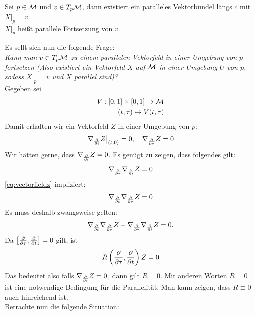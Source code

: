 \begin{defs}
Sei $p \in \mathcal{M}$ und $v \in T_p \mathcal{M}$, dann existiert ein paralleles Vektorbündel längs $c$ mit $X\big\vert_p = v$.\\
$X\big\vert_p$ heißt parallele Fortsetzung von $v$.
\end{defs}
Es sellt sich nun die folgende Frage:\\
\textit{Kann man $v \in T_p \mathcal{M}$ zu einem parallelen Vektorfeld in einer Umgebung von $p$ fortsetzen
(Also existiert ein Vektorfeld $X$ auf $\mathcal{M}$ in einer Umgebung $U$ von $p$, sodass $X\big\vert_p = v$ und $X$ parallel sind)?}\\
Gegeben sei 
\begin{align}
V: [0, 1] \times [0, 1] \to \mathcal{M}\\
(t, \tau) \mapsto V(t, \tau)
\end{align}
Damit erhalten wir ein Vektorfeld $Z$ in einer Umgebung von $p$:
\begin{align}
\label{eq:vectorfieldz}
\nabla_{\pdv{t}} Z \big\vert_{(t, 0)} = 0, \quad \nabla_{\pdv{\tau}} Z = 0
\end{align}
Wir hätten gerne, dass $\nabla_{\pdv{t}} Z = 0$.
Es genügt zu zeigen, dass folgendes gilt:
\begin{align}
\nabla_{\pdv{\tau}}\nabla_{\pdv{t}} Z = 0
\end{align}
\ref{eq:vectorfieldz} impliziert:
\begin{align}
\nabla_{\pdv{t}}\nabla_{\pdv{\tau}} Z = 0
\end{align}
Es muss deshalb zwangsweise gelten:
\begin{align}
\nabla_{\pdv{t}}\nabla_{\pdv{\tau}} Z - \nabla_{\pdv{\tau}}\nabla_{\pdv{t}} Z = 0.
\end{align}
Da $\comm{\pdv{\tau}}{\pdv{t}} = 0$ gilt, ist 
\begin{align}
R \left( \pdv{\tau}, \pdv{t} \right) Z = 0
\end{align} 
Das bedeutet also falls $\nabla_{\pdv{t}}Z = 0$, dann gilt $R=0$.
Mit anderen Worten $R=0$ ist eine notwendige Bedingung für die Parallelität.
Man kann zeigen, dass $R \equiv 0$ auch hinreichend ist.\\

Betrachte nun die folgende Situation:

